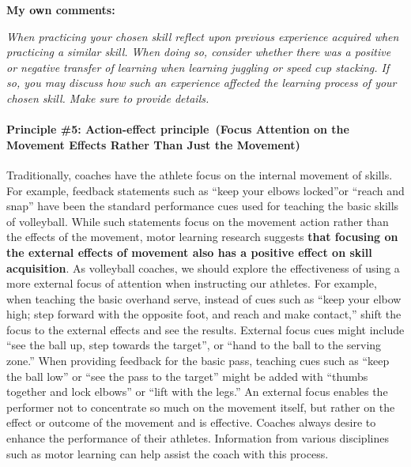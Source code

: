 \documentclass[
  letterpaper,
  DIV=11,
  numbers=noendperiod]{scrartcl}
\let\oldparagraph\paragraph
\renewcommand{\paragraph}[1]{\oldparagraph{#1}\mbox{}}
\begin{document}
\textbf{My own comments:}

\emph{When practicing your chosen skill reflect upon previous experience
acquired when practicing a similar skill. When doing so, consider
whether there was a positive or negative transfer of learning when
learning juggling or speed cup stacking. If so, you may discuss how such
an experience affected the learning process of your chosen skill. Make
sure to provide details.}

\hypertarget{principle-5-action-effect-principle-focus-attention-on-the-movement-effects-rather-than-just-the-movement}{%
\paragraph{\texorpdfstring{\textbf{Principle \#5: Action-effect
principle~(Focus Attention on the Movement Effects Rather Than Just the
Movement)}}{Principle \#5: Action-effect principle~(Focus Attention on the Movement Effects Rather Than Just the Movement)}}\label{principle-5-action-effect-principle-focus-attention-on-the-movement-effects-rather-than-just-the-movement}}

Traditionally, coaches have the athlete focus on the internal movement
of skills. For example, feedback statements such as ``keep your elbows
locked''or ``reach and snap'' have been the standard performance cues
used for teaching the basic skills of volleyball. While such statements
focus on the movement action rather than the effects of the movement,
motor learning research suggests \textbf{that focusing on the external
effects of movement also has a positive effect on skill acquisition}. As
volleyball coaches, we should explore the effectiveness of using a more
external focus of attention when instructing our athletes. For example,
when teaching the basic overhand serve, instead of cues such as ``keep
your elbow high; step forward with the opposite foot, and reach and make
contact,'' shift the focus to the external effects and see the results.
External focus cues might include ``see the ball up, step towards the
target'', or ``hand to the ball to the serving zone.'' When providing
feedback for the basic pass, teaching cues such as ``keep the ball low''
or ``see the pass to the target'' might be added with ``thumbs together
and lock elbows'' or ``lift with the legs.'' An external focus enables
the performer not to concentrate so much on the movement itself, but
rather on the effect or outcome of the movement and is effective.
Coaches always desire to enhance the performance of their athletes.
Information from various disciplines such as motor learning can help
assist the coach with this process.
\end{document}
